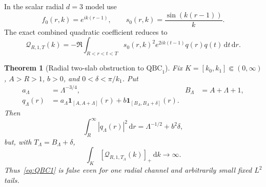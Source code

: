 \documentclass[11pt]{article}
\newcommand{\dd}{\,\mathrm d}
\newtheorem{theorem}{Theorem}[section]
\theoremstyle{definition}
\theoremstyle{remark}
\begin{document}
In the scalar radial $d=3$ model use
\begin{equation}
 f_0(r,k)=e^{ik(r-1)},
 \qquad
 s_0(r,k)=\frac{\sin(k(r-1))}{k}.
\end{equation}
The exact combined quadratic coefficient reduces to
\begin{equation}
 \mathcal Q_{R,1,T}(k)
 =-\Re\int_{R<r<t<T}
 s_0(r,k)^2e^{2ik(t-1)}q(r)q(t)\dd t\dd r.
 \label{eq:QBC-radial-return}
\end{equation}

\begin{theorem}[Radial two-slab obstruction to $\mathrm{QBC}_1$]
\label{thm:QBC-two-slab}
Fix $K=[k_0,k_1]\Subset(0,\infty)$, $A>R>1$, $b>0$, and
$0<\delta<\pi/k_1$.  Put
\begin{align}
 a_\Lambda&=\Lambda^{-3/4},
 &B_\Lambda&=A+\Lambda+1,\label{eq:QBC-slab-parameters}\\
 q_\Lambda(r)
 &=a_\Lambda\mathbf1_{[A,A+\Lambda]}(r)
 +b\mathbf1_{[B_\Lambda,B_\Lambda+\delta]}(r).
 \label{eq:QBC-slab-potential}
\end{align}
Then
\begin{equation}
 \int_R^\infty|q_\Lambda(r)|^2\dd r
 =\Lambda^{-1/2}+b^2\delta,
 \label{eq:QBC-slab-cost}
\end{equation}
but, with $T_\Lambda=B_\Lambda+\delta$,
\begin{equation}
 \int_K[\mathcal Q_{R,1,T_\Lambda}(k)]_+\dd k
 \longrightarrow\infty.
 \label{eq:QBC-slab-divergence}
\end{equation}
Thus~\eqref{eq:QBC1} is false even for one radial channel and arbitrarily
small fixed $L^2$ tails.
\end{theorem}
\end{document}
